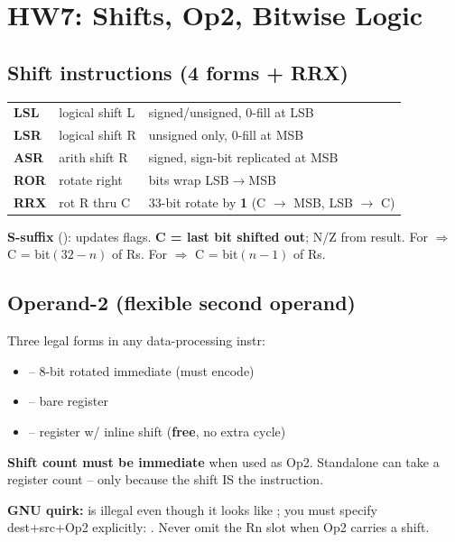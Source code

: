 \section{HW7: Shifts, Op2, Bitwise Logic}

\subsection{Shift instructions (4 forms + RRX)}
\begin{tabular}{@{}l l l@{}}
\textbf{LSL} & logical shift L & signed/unsigned, 0-fill at LSB \\
\textbf{LSR} & logical shift R & unsigned only, 0-fill at MSB \\
\textbf{ASR} & arith shift R & signed, sign-bit replicated at MSB \\
\textbf{ROR} & rotate right & bits wrap LSB$\to$MSB \\
\textbf{RRX} & rot R thru C & 33-bit rotate by \textbf{1} (C $\to$ MSB, LSB $\to$ C) \\
\end{tabular}

\textbf{S-suffix} (): updates flags. \textbf{C = last bit shifted out}; N/Z from result. For  $\Rightarrow$ C = bit$(32{-}n)$ of Rs. For  $\Rightarrow$ C = bit$(n{-}1)$ of Rs.

\subsection{Operand-2 (flexible second operand)}
Three legal forms in any data-processing instr:
\begin{itemize}
\item {} -- 8-bit rotated immediate (must encode)
\item {} -- bare register
\item {} -- register w/ inline shift (\textbf{free}, no extra cycle)
\end{itemize}
\textbf{Shift count must be immediate} when used as Op2. Standalone  can take a register count -- only because the shift IS the instruction.

\textbf{GNU quirk:}  is illegal even though it looks like ; you must specify dest+src+Op2 explicitly: . Never omit the Rn slot when Op2 carries a shift.

